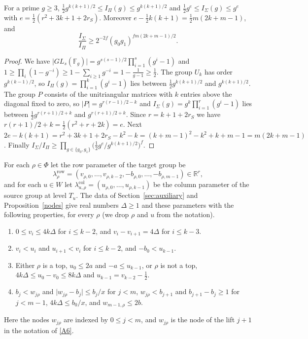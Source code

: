 \begin{lemma}\label{r4:R4:index}
For a prime $g\ge3$, $\frac12g^{k(k+1)/2}\le I_\Pi(g)\le g^{k(k+1)/2}$ and $\frac12g^{e}\le I_\Sigma(g)\le g^{e}$ with $e=\frac12(r^2+3k+1+2r_S)$. Moreover $e-\frac12k(k+1)=\frac12m(2k+m-1)$, and
\[
\frac{I_\Sigma}{I_\Pi}\ge2^{-2f}(g_0g_1)^{fm(2k+m-1)/2}.
\]
\end{lemma}

\begin{proof}
We have $\lvert GL_s(\mathbb F_g)\rvert=g^{s(s-1)/2}\prod_{i=1}^s(g^i-1)$ and $1\ge\prod_i(1-g^{-i})\ge1-\sum_{i\ge1}g^{-i}=1-\frac1{g-1}\ge\frac12$. The group $U_k$ has order $g^{k(k-1)/2}$, so $I_\Pi(g)=\prod_{i=1}^k(g^i-1)$ lies between $\frac12g^{k(k+1)/2}$ and $g^{k(k+1)/2}$. The group $P$ consists of the unitriangular matrices with $k$ entries above the diagonal fixed to zero, so $\lvert P\rvert=g^{r(r-1)/2-k}$ and $I_\Sigma(g)=g^k\prod_{i=1}^r(g^i-1)$ lies between $\frac12g^{r(r+1)/2+k}$ and $g^{r(r+1)/2+k}$. Since $r=k+1+2r_S$ we have $r(r+1)/2+k=\frac12(r^2+r+2k)=e$. Next $2e-k(k+1)=r^2+3k+1+2r_S-k^2-k=(k+m-1)^2-k^2+k+m-1=m(2k+m-1)$. Finally $I_\Sigma/I_\Pi\ge\prod_{g\in\{g_0,g_1\}}\big(\tfrac12g^e/g^{k(k+1)/2}\big)^f$.
\end{proof}

For each $\rho\in\Phi$ let the row parameter of the target group be
\[
\lambda^{\mathrm{row}}_\rho=(v_{\rho,0},\dots,v_{\rho,k-2},-b_{\rho,0},\dots,-b_{\rho,m-1})\in\mathbb R^r,
\]
and for each $u\in W$ let $\lambda^{\mathrm{col}}_{u,\rho}=(u_{\rho,0},\dots,u_{\rho,k-1})$ be the column parameter of the source group at level $T_u$. The data of Section~\ref{sec:auxiliary} and Proposition~\ref{nodes} give real numbers $\Delta\ge1$ and these parameters with the following properties, for every $\rho$ (we drop $\rho$ and $u$ from the notation).
\begin{enumerate}
\item[(P1)] $0\le v_i\le4k\Delta$ for $i\le k-2$, and $v_i-v_{i+1}=4\Delta$ for $i\le k-3$.
\item[(P2)] $v_i<u_i$ and $u_{i+1}<v_i$ for $i\le k-2$, and $-b_0<u_{k-1}$.
\item[(P3)] Either $\rho$ is a top, $u_0\le2a$ and $-a\le u_{k-1}$, or $\rho$ is not a top, $4k\Delta\le u_0-v_0\le8k\Delta$ and $u_{k-1}=v_{k-2}-\frac12$.
\item[(P4)] $b_j<w_{j\rho}$ and $\lvert w_{j\rho}-b_j\rvert\le b_j/x$ for $j<m$, $w_{j\rho}<b_{j+1}$ and $b_{j+1}-b_j\ge1$ for $j<m-1$, $4k\Delta\le b_0/x$, and $w_{m-1,\rho}\le2b$.
\end{enumerate}
Here the nodes $w_{j\rho}$ are indexed by $0\le j<m$, and $w_{j\rho}$ is the node of the lift $j+1$ in the notation of \eqref{A6}.


